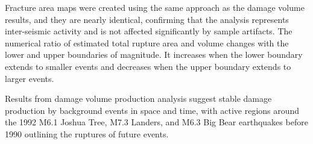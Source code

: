 \documentclass[12pt]{article} %
\theoremstyle{plain}
\begin{document}
	Fracture area maps were created using the same approach as the damage volume results, and they are nearly identical, confirming that the analysis represents inter-seismic activity and is not affected significantly by sample artifacts. The numerical ratio of estimated total rupture area and volume changes with the lower and upper boundaries of magnitude. It increases when the lower boundary extends to smaller events and decreases when the upper boundary extends to larger events.
	
	Results from damage volume production analysis suggest stable damage production by background events in space and time, with active regions around the 1992 M6.1 Joshua Tree, M7.3 Landers, and M6.3 Big Bear earthquakes before 1990 outlining the ruptures of future events.
	
	
\end{document}
